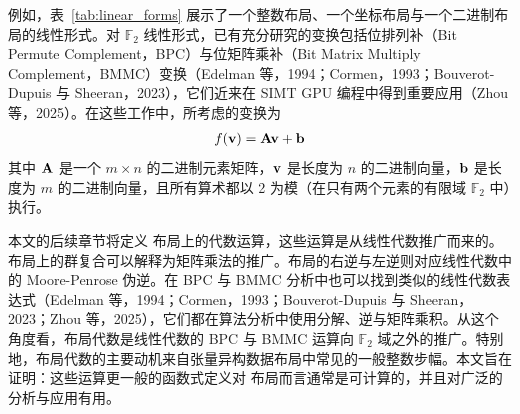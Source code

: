 例如，表~\ref{tab:linear_forms} 展示了一个整数布局、一个坐标布局与一个二进制布局的线性形式。对 $\mathbb{F}_2$ 线性形式，已有充分研究的变换包括位排列补（Bit Permute Complement，BPC）与位矩阵乘补（Bit Matrix Multiply Complement，BMMC）变换（Edelman 等，1994；Cormen，1993；Bouverot-Dupuis 与 Sheeran，2023），它们近来在 SIMT GPU 编程中得到重要应用（Zhou 等，2025）。在这些工作中，所考虑的变换为
\begin{align}
f(\mathbf{v}) = \mathbf{A} \mathbf{v} + \mathbf{b}
\label{eqn:linear}
\end{align}
其中 $\mathbf{A}$ 是一个 $m {\times} n$ 的二进制元素矩阵，$\mathbf{v}$ 是长度为 $n$ 的二进制向量，$\mathbf{b}$ 是长度为 $m$ 的二进制向量，且所有算术都以 2 为模（在只有两个元素的有限域 $\mathbb{F}_2$ 中）执行。

本文的后续章节将定义 \CuTe 布局上的代数运算，这些运算是从线性代数推广而来的。\CuTe 布局上的群复合可以解释为矩阵乘法的推广。\CuTe 布局的右逆与左逆则对应线性代数中的 Moore-Penrose 伪逆。在 BPC 与 BMMC 分析中也可以找到类似的线性代数表达式（Edelman 等，1994；Cormen，1993；Bouverot-Dupuis 与 Sheeran，2023；Zhou 等，2025），它们都在算法分析中使用分解、逆与矩阵乘积。从这个角度看，\CuTe 布局代数是线性代数的 BPC 与 BMMC 运算向 $\mathbb{F}_2$ 域之外的推广。特别地，\CuTe 布局代数的主要动机来自张量异构数据布局中常见的一般整数步幅。本文旨在证明：这些运算更一般的函数式定义对 \CuTe 布局而言通常是可计算的，并且对广泛的分析与应用有用。
